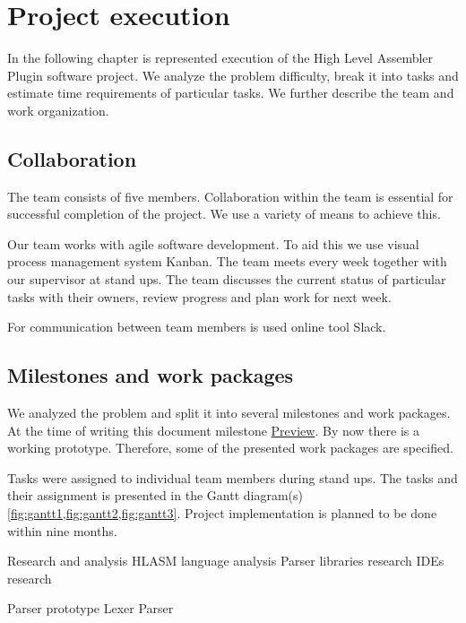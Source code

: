 \chapter{Project execution}

In the following chapter is represented execution of the High Level Assembler Plugin software project. 
We analyze the problem difficulty, break it into tasks and estimate time requirements of particular tasks.
We further describe the team and work organization.

\section{Collaboration}
The team consists of five members. Collaboration within the team is essential for successful completion of the project. We use a variety of means to achieve this. 

Our team works with agile software development. To aid this we use visual process management system Kanban. The team meets every week together with our supervisor at stand ups. The team discusses the current status of particular tasks with their owners, review progress and plan work for next week.

For communication between team members is used online tool Slack.

\section{Milestones and work packages}
We analyzed the problem and split it into several milestones and work packages. At the time of writing this document milestone \hyperref[milestone_preview]{Preview}. By now there is a working prototype. Therefore, some of the presented work packages are specified. 

Tasks were assigned to individual team members during stand ups. The tasks and their assignment  is presented in the Gantt diagram(s)  \cref{fig:gantt1,fig:gantt2,fig:gantt3}. 
Project implementation is planned to be done within nine months. 

\bms
	\itemm Research and analysis 
		\bwp
			\itemwp HLASM language analysis 
			\itemwp Parser libraries research 
			\itemwp IDEs research 
		\eenum
	
	\itemm Parser prototype 
		\bwp
			\itemwp Lexer 
			\itemwp Parser 
		\eenum
	
